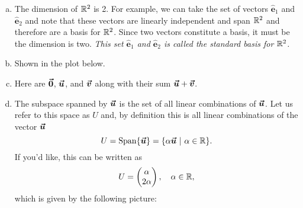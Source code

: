 \documentclass[12pt]{article} %
\newcommand{\ehat}{\boldsymbol{\hat{e}}}
\newcommand{\Span}{\operatorname{Span}}
\begin{document}
\begin{solution}
\begin{enumerate}[(a)]~
    \item The dimension of $\mathbb{R}^2$ is 2. For example, we can take the set of vectors $\ehat_1$ and $\ehat_2$ and note that these vectors are linearly independent and span $\mathbb{R}^2$ and therefore are a basis for $\mathbb{R}^2$. Since two vectors constitute a basis, it must be the dimension is two. \emph{This set $\ehat_1$ and $\ehat_2$ is called the standard basis for $\mathbb{R}^2$.}
    \item Shown in the plot below.
    \item Here are $\boldsymbol{\vec{0}}$, $\boldsymbol{\vec{u}}$, and $\boldsymbol{\vec{v}}$ along with their sum $\boldsymbol{\vec{u}}+\boldsymbol{\vec{v}}$.
    \begin{center}
        \end{center}

\item The subspace spanned by $\boldsymbol{\vec{u}}$ is the set of all linear combinations of $\boldsymbol{\vec{u}}$. Let us refer to this space as $U$ and, by definition this is all linear combinations of the vector $\boldsymbol{\vec{u}}$
\[
U = \Span\{\vecu\} = \{ \alpha \vecu ~\vert~ \alpha \in \R\}.
\]
If you'd like, this can be written as
\[
U = \begin{pmatrix} \alpha \\ 2\alpha \end{pmatrix}, \quad \alpha \in \mathbb{R},
\]
which is given by the following picture:
    \begin{center}
        \end{center}
\end{enumerate}
\end{solution}
\end{document}
